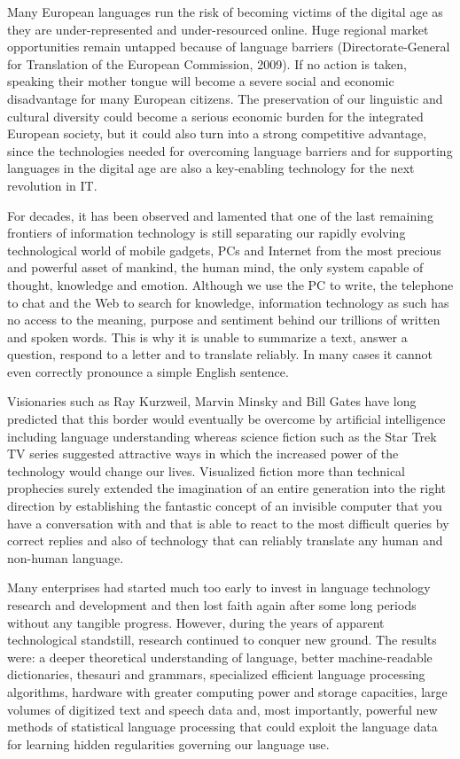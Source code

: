 \documentclass[10pt, plain]{../../metanetpaper}
\begin{document}
\begin{multicols}{2}
Many European languages run the risk of becoming victims of the digital age as they are under-represented and under-resourced online. Huge regional market opportunities remain untapped because of language barriers (Directorate-General for Translation of the European Commission, 2009). If no action is taken, speaking their mother tongue will become a severe social and economic disadvantage for many European citizens. The preservation of our linguistic and cultural diversity could become a serious economic burden for the integrated European society, but it could also turn into a strong competitive advantage, since the technologies needed for overcoming language barriers and for supporting languages in the digital age are also a key-enabling technology for the next revolution in IT. 

For decades, it has been observed and lamented that one of the last remaining frontiers of information technology is still separating our rapidly evolving technological world of mobile gadgets, PCs and Internet from the most precious and powerful asset of mankind, the human mind, the only system capable of thought, knowledge and emotion. Although we use the PC to write, the telephone to chat and the Web to search for knowledge, information technology as such has no access to the meaning, purpose and sentiment behind our trillions of written and spoken words. This is why it is unable to summarize a text, answer a question, respond to a letter and to translate reliably. In many cases it cannot even correctly pronounce a simple English sentence.   

Visionaries such as Ray Kurzweil, Marvin Minsky and Bill Gates have long predicted that this border would eventually be overcome by artificial intelligence including language understanding whereas science fiction such as the Star Trek TV series suggested attractive ways in which the increased power of the technology would change our lives. Visualized fiction more than technical prophecies surely extended the imagination of an entire generation into the right direction by establishing the fantastic concept of an invisible computer that you have a conversation with and that is able to react to the most difficult queries by correct replies and also of technology that can reliably translate any human and non-human language.

Many enterprises had started much too early to invest in language technology research and development and then lost faith again after some long periods without any tangible progress. However, during the years of apparent technological standstill, research continued to conquer new ground. The results were: a deeper theoretical understanding of language, better machine-readable dictionaries, thesauri and grammars, specialized efficient language processing algorithms, hardware with greater computing power and storage capacities, large volumes of digitized text and speech data and, most importantly, powerful new methods of statistical language processing that could exploit the language data for learning hidden regularities governing our language use.


\end{multicols}
\end{document}
